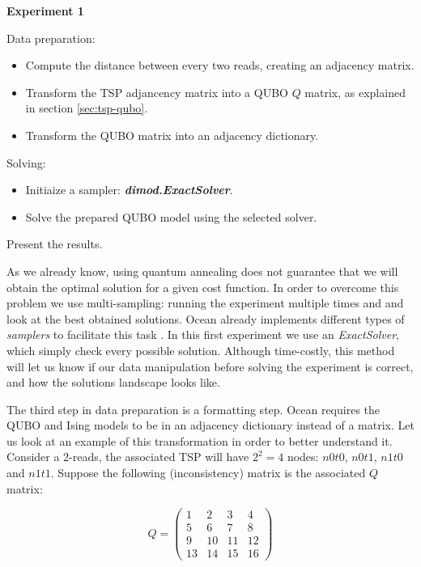 \begin{algorithm}
	\caption*{\textbf{Experiment 1}}
	
	Data preparation:
	\begin{itemize}
		\item Compute the distance between every two reads, creating an adjacency matrix.
		\item Transform the TSP adjancency matrix into a QUBO $Q$ matrix, as explained in section \ref{sec:tsp-qubo}.
		\item Transform the QUBO matrix into an adjacency dictionary.
	\end{itemize}

	Solving:
	\begin{itemize}
		\item Initiaize a sampler: \textbf{\emph{dimod.ExactSolver}}.
		\item Solve the prepared QUBO model using the selected solver.
	\end{itemize}
	
	Present the results.
\end{algorithm}

As we already know, using quantum annealing does not guarantee that we will obtain the optimal solution for a given cost function. In order to overcome this problem we use multi-sampling: running the experiment multiple times and and look at the best obtained solutions. Ocean already implements different types of \emph{samplers} to facilitate this task \cite{DWave-OceanDoc-Samplers}. In this first experiment we use an \emph{ExactSolver}, which simply check every possible solution. Although time-costly, this method will let us know if our data manipulation before solving the experiment is correct, and how the solutions landscape looks like.

The third step in data preparation is a formatting step. Ocean requires the QUBO and Ising models to be in an adjacency dictionary instead of a matrix. Let us look at an example of this transformation in order to better understand it. Consider a 2-reads, the associated TSP will have $2^2 = 4$ nodes: $n0t0$, $n0t1$, $n1t0$ and $n1t1$. Suppose the following (inconsistency) matrix is the associated $Q$ matrix:

$$
Q = 
\left(
\begin{array}{cccc}
	1 & 2 & 3 & 4 \\
	5 & 6 & 7 & 8 \\
	9 & 10 & 11 & 12 \\
	13 & 14 & 15 & 16 
\end{array}
\right)
$$

